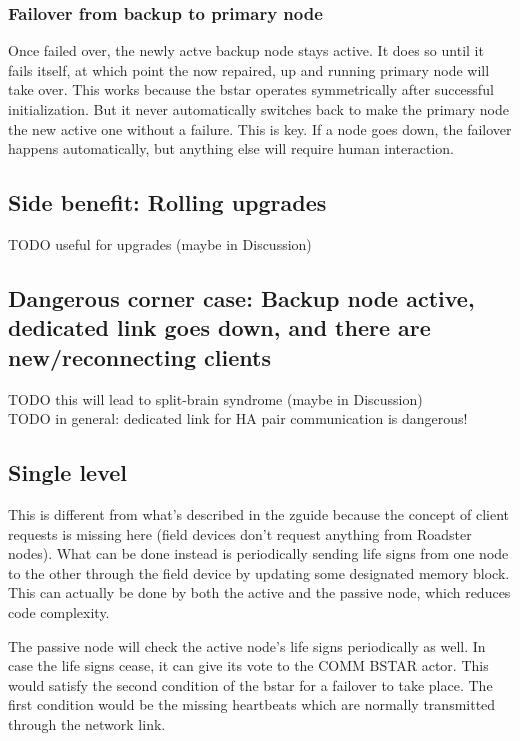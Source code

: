 \subsubsection{Failover from backup to primary node}
Once failed over, the newly actve backup node stays active. It does so until it
fails itself, at which point the now repaired, up and running primary node will
take over. This works because the \gls{bstar} operates symmetrically
after successful initialization. But it never automatically switches back to
make the primary node the new active one without a failure. This is key. If a
node goes down, the failover happens automatically, but anything else will
require human interaction.

\subsection{Side benefit: Rolling upgrades}
TODO useful for upgrades (maybe in Discussion)\\

\subsection{Dangerous corner case: Backup node active, dedicated link goes down, and there are new/reconnecting clients}
TODO this will lead to split-brain syndrome (maybe in Discussion)\\
TODO in general: dedicated link for HA pair communication is dangerous!\\

\subsection{Single level}
This is different from what's described in the \gls{zguide} because the concept of
client requests is missing here (field devices don't request anything from Roadster nodes).  What can be
done instead is periodically sending life signs from one node to the other
through the field device by updating some designated memory block. This can actually be
done by both the active and the passive node, which reduces code complexity.

The passive node will check the active node's life signs periodically as well.
In case the life signs cease, it can give its vote to the COMM BSTAR actor.
This would satisfy the second condition of the \gls{bstar} for a
failover to take place. The first condition would be the missing heartbeats
which are normally transmitted through the network link.

